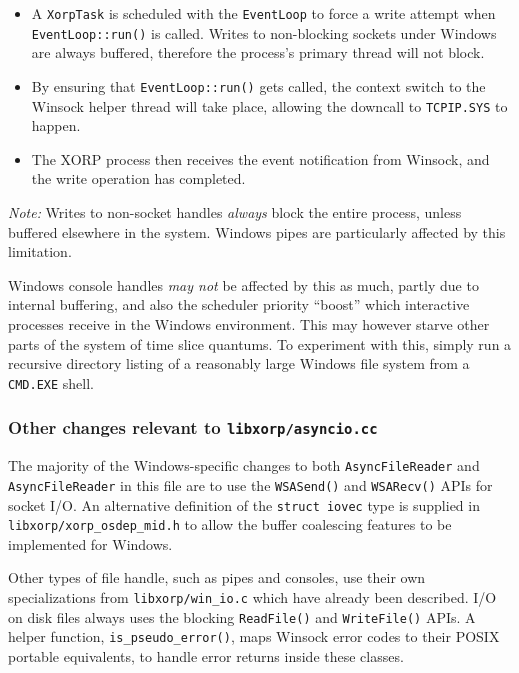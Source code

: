 \documentclass[11pt]{article}
\begin{document}
{\begin{itemize}
 \item A {\tt XorpTask} is scheduled with the {\tt EventLoop}
to force a write attempt when {\tt EventLoop::run()} is called.
Writes to non-blocking sockets under Windows are always buffered,
therefore the process's primary thread will not block.

 \item By ensuring that {\tt EventLoop::run()} gets called, the context
switch to the Winsock helper thread will take place, allowing the
downcall to {\tt TCPIP.SYS} to happen.

 \item The XORP process then receives the event notification from Winsock,
and the write operation has completed.

\end{itemize}

{\em Note:} Writes to non-socket handles {\em always}
block the entire process, unless buffered elsewhere in the system. Windows
pipes are particularly affected by this limitation.

Windows console handles {\em may not} be affected by this as much,
partly due to internal buffering,
and also the scheduler priority ``boost'' which interactive processes receive in
the Windows environment.
This may however starve other parts of the system of time slice quantums.
To experiment with this, simply run a
recursive directory listing of a reasonably large Windows file system from
a {\tt CMD.EXE} shell.


\subsubsection{Other changes relevant to {\tt libxorp/asyncio.cc}}

The majority of the Windows-specific changes to both
{\tt AsyncFileReader} and {\tt AsyncFileReader}
in this file are to use the {\tt WSASend()} and {\tt WSARecv()}
APIs for socket I/O.
An alternative definition of the {\tt struct iovec} type
is supplied in {\tt libxorp/xorp\_osdep\_mid.h}
to allow the buffer coalescing features
to be implemented for Windows.

Other types of file handle, such as pipes and consoles, use
their own specializations from {\tt libxorp/win\_io.c} which
have already been described.
I/O on disk files always uses the blocking
{\tt ReadFile()} and {\tt WriteFile()} APIs.
A helper function, {\tt is\_pseudo\_error()},
maps Winsock error codes to their
POSIX portable equivalents, to handle error returns inside these classes.

}
\end{document}
